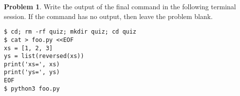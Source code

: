 \documentclass[10pt]{article}
\theoremstyle{definition}
\newtheorem{problem}{Problem}
\begin{document}
\filbreak
\begin{problem}
    Write the output of the final command in the following terminal session.
    If the command has no output, then leave the problem blank.
\end{problem}
\begin{lstlisting}
$ cd; rm -rf quiz; mkdir quiz; cd quiz
$ cat > foo.py <<EOF
xs = [1, 2, 3]
ys = list(reversed(xs))
print('xs=', xs)
print('ys=', ys)
EOF
$ python3 foo.py
\end{lstlisting}
\end{document}
